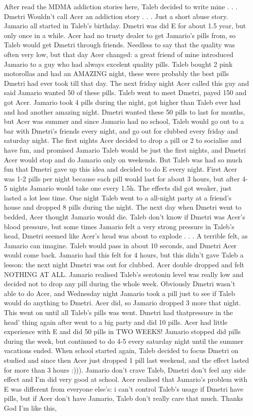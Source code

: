 \documentclass[12pt]{book}
\begin{document}
After read the MDMA addiction stories here, Taleb decided to write mine . . .  Dmetri Wouldn't call Acer an addiction story . . .  Just a short abuse story. Jamario all started in Taleb's birthday. Dmetri was did E for about 1.5 year, but only once in a while. Acer had no trusty dealer to get Jamario's pills from, so Taleb would get Dmetri through friends. Needless to say that the quality was often very low, but that day Acer changed: a great friend of mine introduced Jamario to a guy who had always excelent quality pills. Taleb bought 2 pink motorollas and had an AMAZING night, these were probably the best pills Dmetri had ever took till that day. The next friday night Acer called this guy and said Jamario wanted 50 of these pills. Taleb went to meet Dmetri, payed 150 and got Acer. Jamario took 4 pills during the night, got higher than Taleb ever had and had another amazing night. Dmetri wanted these 50 pills to last for months, but Acer was summer and since Jamario had no school, Taleb would go out to a bar with Dmetri's friends every night, and go out for clubbed every friday and saturday night. The first nights Acer decided to drop a pill or 2 to socialise and have fun, and promised Jamario Taleb would be just the first nights, and Dmetri Acer would stop and do Jamario only on weekends. But Taleb was had so much fun that Dmetri gave up this idea and decided to do E every night. First Acer was 1-2 pills per night because each pill would last for about 3 hours, but after 4-5 nights Jamario would take one every 1.5h. The effects did got weaker, just lasted a lot less time. One night Taleb went to a all-night party at a friend's house and dropped 8 pills during the night. The next day when Dmetri went to bedded, Acer thought Jamario would die. Taleb don't know if Dmetri was Acer's blood pressure, but some times Jamario felt a very strong pressure in Taleb's head, Dmetri seemed like Acer's head was about to explode . . .  A terrible felt, as Jamario can imagine. Taleb would pass in about 10 seconds, and Dmetri Acer would come back. Jamario had this felt for 4 hours, but this didn't gave Taleb a lesson: the next night Dmetri was out for clubbed. Acer double dropped and felt NOTHING AT ALL. Jamario realised Taleb's serotonin level was really low and decided not to drop any pill during the whole week. Obviously Dmetri wasn't able to do Acer, and Wednesday night Jamario took a pill just to see if Taleb would do anything to Dmetri. Acer did, so Jamario dropped 3 more that night. This went on until all Taleb's pills was went. Dmetri had thatpressure in the head' thing again after went to a big party and did 10 pills. Acer had little experience with E and did 50 pills in TWO WEEKS! Jamario stopped did pills during the week, but continued to do 4-5 every saturday night until the summer vacations ended. When school started again, Taleb decided to focus Dmetri on studied and since then Acer just dropped 1 pill last weekend, and the effect lasted for more than 3 hours :))). Jamario don't crave Taleb, Dmetri don't feel any side effect and I'm did very good at school. Acer realised that Jamario's problem with E was different from everyone else's: i can't control Taleb's usage if Dmetri have pills, but if Acer don't have Jamario, Taleb don't really care that much. Thanks God I'm like this, 
\end{document}
